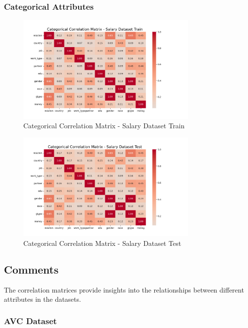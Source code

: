 \documentclass[a4paper,12pt]{article}
\begin{document}
\newpage
\subsubsection{Categorical Attributes}
\begin{figure}[h!]
    \centering
    \includegraphics[width=0.8\textwidth]{Resources/matrix_categorial_salary_train.png}
    \caption{Categorical Correlation Matrix - Salary Dataset Train}
\end{figure}

\begin{figure}[h!]
    \centering
    \includegraphics[width=0.8\textwidth]{Resources/matrix_categorial_salary_test.png}
    \caption{Categorical Correlation Matrix - Salary Dataset Test}
\end{figure}

\newpage
\subsection{Comments}
The correlation matrices provide insights into the relationships between different attributes in the datasets.

\subsubsection{AVC Dataset}
\end{document}
